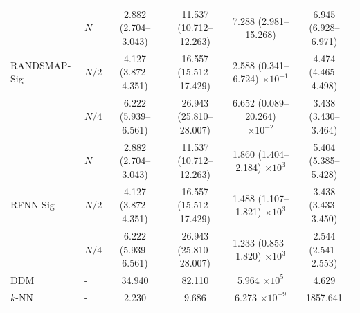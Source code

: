 \documentclass{article}
\begin{document}
\begin{table}[htbp]
{\begin{tabular}{@{}llcccc@{}}
\multirow{3}{*}{RANDSMAP-Sig} 
&	$N$	    & 2.882 (2.704--3.043) & 11.537 (10.712--12.263) & 7.288 (2.981--15.268)                  & 6.945 (6.928--6.971) \\
&	$N/2$	& 4.127 (3.872--4.351) & 16.557 (15.512--17.429) & 2.588 (0.341--6.724) $\times 10^{-1}$  & 4.474 (4.465--4.498) \\
&	$N/4$	& 6.222 (5.939--6.561) & 26.943 (25.810--28.007) & 6.652 (0.089--20.264) $\times 10^{-2}$ & 3.438 (3.430--3.464) \\
\midrule

\multirow{3}{*}{RFNN-Sig} 
&	$N$	     & 2.882 (2.704--3.043) & 11.537 (10.712--12.263) & 1.860 (1.404--2.184) $\times 10^3$ & 5.404 (5.385--5.428) \\
&	$N/2$	 & 4.127 (3.872--4.351) & 16.557 (15.512--17.429) & 1.488 (1.107--1.821) $\times 10^3$ & 3.438 (3.433--3.450) \\
&	$N/4$	 & 6.222 (5.939--6.561) & 26.943 (25.810--28.007) & 1.233 (0.853--1.820) $\times 10^3$ & 2.544 (2.541--2.553) \\
\midrule

DDM  &	-	& 34.940 & 82.110 & 5.964 $\times 10^{5}$  & 4.629    \\
$k$-NN &	-	& 2.230  & 9.686  & 6.273 $\times 10^{-9}$ & 1857.641 \\

\bottomrule
\end{tabular}%
}
\end{table}
\end{document}
